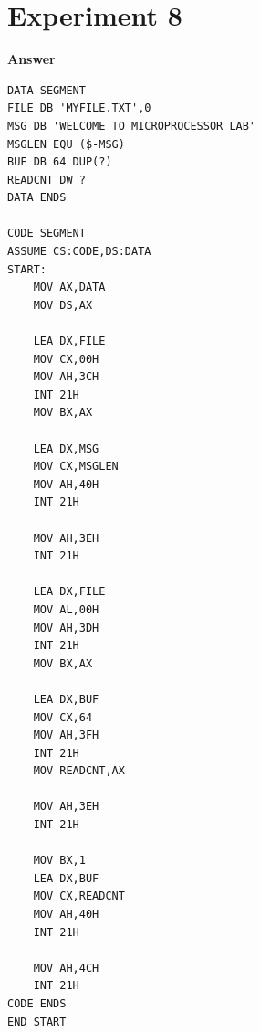\documentclass[11pt,a4paper]{article}
\begin{document}
\section*{Experiment 8}
\noindent{}
\vspace{0.4em}
\noindent\textbf{Answer}
\begin{lstlisting}[style=asmbase]
DATA SEGMENT
FILE DB 'MYFILE.TXT',0
MSG DB 'WELCOME TO MICROPROCESSOR LAB'
MSGLEN EQU ($-MSG)
BUF DB 64 DUP(?)
READCNT DW ?
DATA ENDS

CODE SEGMENT
ASSUME CS:CODE,DS:DATA
START:
    MOV AX,DATA
    MOV DS,AX

    LEA DX,FILE
    MOV CX,00H
    MOV AH,3CH
    INT 21H
    MOV BX,AX

    LEA DX,MSG
    MOV CX,MSGLEN
    MOV AH,40H
    INT 21H

    MOV AH,3EH
    INT 21H

    LEA DX,FILE
    MOV AL,00H
    MOV AH,3DH
    INT 21H
    MOV BX,AX

    LEA DX,BUF
    MOV CX,64
    MOV AH,3FH
    INT 21H
    MOV READCNT,AX

    MOV AH,3EH
    INT 21H

    MOV BX,1
    LEA DX,BUF
    MOV CX,READCNT
    MOV AH,40H
    INT 21H

    MOV AH,4CH
    INT 21H
CODE ENDS
END START
\end{lstlisting}
\end{document}
